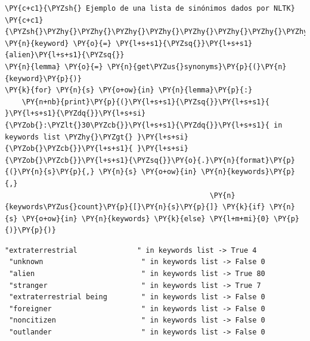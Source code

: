     \begin{tcolorbox}[breakable, size=fbox, boxrule=1pt, pad at break*=1mm,colback=cellbackground, colframe=cellborder]
\begin{Verbatim}[commandchars=\\\{\}]
\PY{c+c1}{\PYZsh{} Ejemplo de una lista de sinónimos dados por NLTK}
\PY{c+c1}{\PYZsh{}\PYZhy{}\PYZhy{}\PYZhy{}\PYZhy{}\PYZhy{}\PYZhy{}\PYZhy{}\PYZhy{}\PYZhy{}\PYZhy{}\PYZhy{}\PYZhy{}\PYZhy{}\PYZhy{}\PYZhy{}\PYZhy{}\PYZhy{}\PYZhy{}\PYZhy{}\PYZhy{}\PYZhy{}\PYZhy{}\PYZhy{}\PYZhy{}\PYZhy{}\PYZhy{}\PYZhy{}\PYZhy{}\PYZhy{}\PYZhy{}\PYZhy{}\PYZhy{}\PYZhy{}\PYZhy{}\PYZhy{}\PYZhy{}\PYZhy{}\PYZhy{}\PYZhy{}\PYZhy{}\PYZhy{}\PYZhy{}\PYZhy{}\PYZhy{}\PYZhy{}\PYZhy{}\PYZhy{}\PYZhy{}\PYZhy{}\PYZhy{}\PYZhy{}}
\PY{n}{keyword} \PY{o}{=} \PY{l+s+s1}{\PYZsq{}}\PY{l+s+s1}{alien}\PY{l+s+s1}{\PYZsq{}}
\PY{n}{lemma} \PY{o}{=} \PY{n}{get\PYZus{}synonyms}\PY{p}{(}\PY{n}{keyword}\PY{p}{)}
\PY{k}{for} \PY{n}{s} \PY{o+ow}{in} \PY{n}{lemma}\PY{p}{:}
    \PY{n+nb}{print}\PY{p}{(}\PY{l+s+s1}{\PYZsq{}}\PY{l+s+s1}{ }\PY{l+s+s1}{\PYZdq{}}\PY{l+s+si}{\PYZob{}:\PYZlt{}30\PYZcb{}}\PY{l+s+s1}{\PYZdq{}}\PY{l+s+s1}{ in keywords list \PYZhy{}\PYZgt{} }\PY{l+s+si}{\PYZob{}\PYZcb{}}\PY{l+s+s1}{ }\PY{l+s+si}{\PYZob{}\PYZcb{}}\PY{l+s+s1}{\PYZsq{}}\PY{o}{.}\PY{n}{format}\PY{p}{(}\PY{n}{s}\PY{p}{,} \PY{n}{s} \PY{o+ow}{in} \PY{n}{keywords}\PY{p}{,}
                                                \PY{n}{keywords\PYZus{}count}\PY{p}{[}\PY{n}{s}\PY{p}{]} \PY{k}{if} \PY{n}{s} \PY{o+ow}{in} \PY{n}{keywords} \PY{k}{else} \PY{l+m+mi}{0} \PY{p}{)}\PY{p}{)}
\end{Verbatim}
\end{tcolorbox}

    \begin{Verbatim}[commandchars=\\\{\}]
 "extraterrestrial              " in keywords list -> True 4
 "unknown                       " in keywords list -> False 0
 "alien                         " in keywords list -> True 80
 "stranger                      " in keywords list -> True 7
 "extraterrestrial being        " in keywords list -> False 0
 "foreigner                     " in keywords list -> False 0
 "noncitizen                    " in keywords list -> False 0
 "outlander                     " in keywords list -> False 0
\end{Verbatim}

